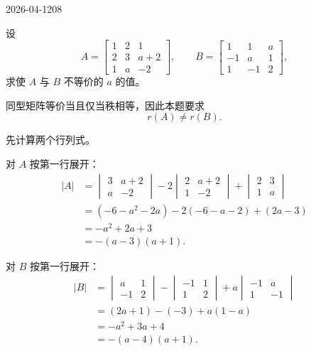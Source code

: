 \begin{mistake}{2026-04-12}{08}

\begin{problemcontent}
设
\[
A=\begin{bmatrix}
1&2&1\\
2&3&a+2\\
1&a&-2
\end{bmatrix},
\qquad
B=\begin{bmatrix}
1&1&a\\
-1&a&1\\
1&-1&2
\end{bmatrix},
\]
求使 \(A\) 与 \(B\) 不等价的 \(a\) 的值。

\end{problemcontent}

\begin{solutioncontent}
同型矩阵等价当且仅当秩相等，因此本题要求
\[
r(A)\ne r(B).
\]

先计算两个行列式。

对 \(A\) 按第一行展开：
\[
\begin{aligned}
|A|
&=\begin{vmatrix}3&a+2\\ a&-2\end{vmatrix}
-2\begin{vmatrix}2&a+2\\ 1&-2\end{vmatrix}
+\begin{vmatrix}2&3\\ 1&a\end{vmatrix}\\
&=( -6-a^2-2a)-2(-6-a-2)+(2a-3)\\
&=-a^2+2a+3\\
&=-(a-3)(a+1).
\end{aligned}
\]

对 \(B\) 按第一行展开：
\[
\begin{aligned}
|B|
&=\begin{vmatrix}a&1\\ -1&2\end{vmatrix}
-\begin{vmatrix}-1&1\\ 1&2\end{vmatrix}
+a\begin{vmatrix}-1&a\\ 1&-1\end{vmatrix}\\
&=(2a+1)-(-3)+a(1-a)\\
&=-a^2+3a+4\\
&=-(a-4)(a+1).
\end{aligned}
\]


\end{solutioncontent}
\end{mistake}

